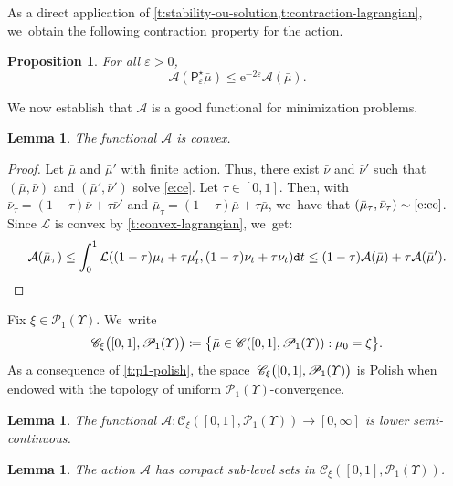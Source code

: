 \documentclass[JEP,XML,SOM,Unicode,published]{cedram}
\newtheorem{lemma}[theorem]{Lemma}
\newtheorem{proposition}[theorem]{Proposition}
\theoremstyle{definition}
\theoremstyle{remark}
\DeclarePairedDelimiter{\paren}{\lparen}{\rparen}
\DeclarePairedDelimiter{\set}{\lbrace}{\rbrace}
\begin{document}
As a direct application of \cref{t:stability-ou-solution,t:contraction-lagrangian}, we~obtain the following contraction property for the action.
\begin{proposition}\label{t:contraction-action}
For all $\varepsilon > 0$,
\begin{equation*}
\mathcal{A}(\mathsf{P}^{\star}_{\varepsilon} \bar{\mu}) \le \mathrm{e}^{-2\varepsilon} \mathcal{A}(\bar{\mu}).
\end{equation*}
\end{proposition}

We now establish that $\mathcal{A}$ is a good functional for minimization problems.

\begin{lemma}\label{t:convex-action}
The functional $\mathcal{A}$ is convex.
\end{lemma}

\begin{proof}
Let $\bar{\mu}$ and $\bar{\mu}'$ with finite action.
Thus, there exist $\bar{\nu}$ and $\bar{\nu}'$ such that $(\bar{\mu}, \bar{\nu})$ and $(\bar{\mu}', \bar{\nu}')$ solve \cref{e:ce}.
Let $\tau \in [0,1]$.
Then, with $\bar{\nu}_{\tau} = (1-\tau) \bar{\nu} + \tau \bar{\nu}'$ and $\bar{\mu}_{\tau} = (1-\tau) \bar{\mu} + \tau \bar{\mu}$, we~have that $(\bar{\mu}_{\tau}, \bar{\nu}_{\tau}) \sim \cref{e:ce}$.
Since $\mathcal{L}$ is convex by \cref{t:convex-lagrangian}, we~get:
\begin{equation*}
\mathcal{A}(\bar{\mu}_{\tau}) \leq \int_{0}^{1} \mathcal{L}\paren*{(1-\tau) \mu_{t} + \tau \mu'_{t}, (1-\tau) \nu_{t} + \tau \nu_{t}} \mathtt{d} t \leq (1-\tau) \mathcal{A}(\bar{\mu}) + \tau \mathcal{A}(\bar{\mu}').
\qedhere
\end{equation*}
\end{proof}

Fix $\xi \in \mathscr{P}_{1}(\varUpsilon)$. We~write
\begin{equation*}
\mathscr{C}_{\xi}\paren[\big]{[0,1], \mathscr{P}_{1}(\varUpsilon)} \coloneq \set[\big]{ \bar{\mu} \in \mathscr{C}([0,1], \mathscr{P}_{1}(\varUpsilon)) : \mu_{0} = \xi }.
\end{equation*}
As a consequence of \cref{t:p1-polish}, the space~$\mathscr{C}_{\xi}\paren[\big]{[0,1], \mathscr{P}_{1}(\varUpsilon)}$ is Polish when endowed with the topology of uniform $\mathscr{P}_1(\varUpsilon)$-convergence.

\begin{lemma}\label{t:lsc-action}
The functional $\mathcal{A} \colon \mathscr{C}_{\xi}([0,1], \mathscr{P}_{1}(\varUpsilon)) \to [0,\infty]$ is lower semi-con\-tin\-u\-ous.
\end{lemma}
\begin{lemma}\label{t:compact-action}
The action $\mathcal{A}$ has compact sub-level sets in $\mathscr{C}_{\xi}([0,1], \mathscr{P}_{1}(\varUpsilon))$.
\end{lemma}
\end{document}
